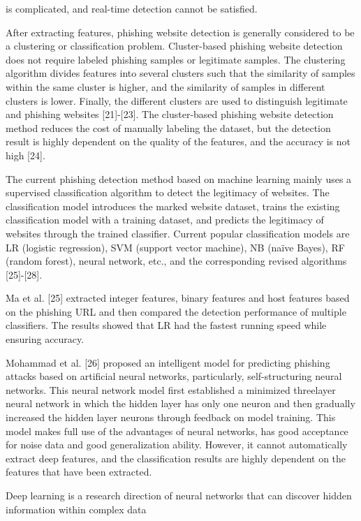 \documentclass{ieeeaccess}
\begin{document}
is complicated, and real-time detection cannot be satisfied.\par After extracting features, phishing website detection is
generally considered to be a clustering or classification
problem. Cluster-based phishing website detection does not
require labeled phishing samples or legitimate samples. The
clustering algorithm divides features into several clusters
such that the similarity of samples within the same cluster
is higher, and the similarity of samples in different clusters
is lower. Finally, the different clusters are used to distinguish
legitimate and phishing websites [21]-[23]. The cluster-based
phishing website detection method reduces the cost of manually
labeling the dataset, but the detection result is highly
dependent on the quality of the features, and the accuracy is
not high [24].\par The current phishing detection method based on machine
learning mainly uses a supervised classification algorithm to
detect the legitimacy of websites. The classification model
introduces the marked website dataset, trains the existing
classification model with a training dataset, and predicts
the legitimacy of websites through the trained classifier.
Current popular classification models are LR (logistic regression),
SVM (support vector machine), NB (naïve Bayes), RF
(random forest), neural network, etc., and the corresponding
revised algorithms [25]-[28].\par Ma et al. [25] extracted integer features, binary features
and host features based on the phishing URL and then compared
the detection performance of multiple classifiers. The
results showed that LR had the fastest running speed while
ensuring accuracy.\par Mohammad et al. [26] proposed an intelligent model for
predicting phishing attacks based on artificial neural networks,
particularly, self-structuring neural networks. This
neural network model first established a minimized threelayer
neural network in which the hidden layer has only
one neuron and then gradually increased the hidden layer
neurons through feedback on model training. This model
makes full use of the advantages of neural networks, has good
acceptance for noise data and good generalization ability.
However, it cannot automatically extract deep features, and
the classification results are highly dependent on the features
that have been extracted.\par Deep learning is a research direction of neural networks
that can discover hidden information within complex data
\end{document}
